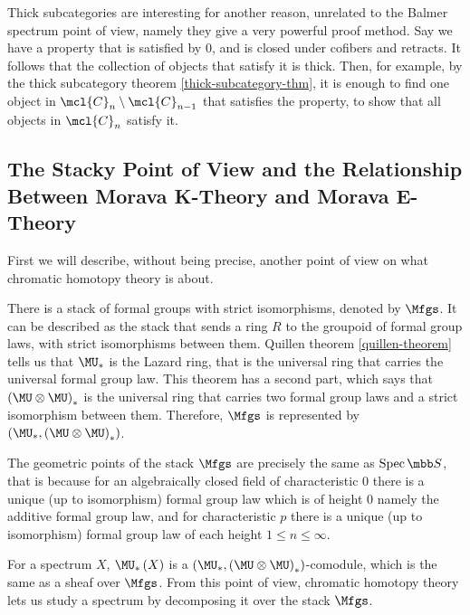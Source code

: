\begin{remark}
	Thick subcategories are interesting for another reason, unrelated to the Balmer spectrum point of view, namely they give a very powerful proof method.
	Say we have a property that is satisfied by $0$, and is closed under cofibers and retracts.
	It follows that the collection of objects that satisfy it is thick.
	Then, for example, by the thick subcategory theorem \ref{thick-subcategory-thm}, it is enough to find one object in $\mcl{C}_n \setminus \mcl{C}_{n-1}$ that satisfies the property, to show that all objects in $\mcl{C}_n$ satisfy it.
\end{remark}



\subsection{The Stacky Point of View and the Relationship Between Morava K-Theory and Morava E-Theory}

First we will describe, without being precise, another point of view on what chromatic homotopy theory is about.

There is a stack of formal groups with strict isomorphisms, denoted by $\Mfgs$.
It can be described as the stack that sends a ring $R$ to the groupoid of formal group laws, with strict isomorphisms between them.
Quillen theorem \ref{quillen-theorem} tells us that $\MU_*$ is the Lazard ring, that is the universal ring that carries the universal formal group law.
This theorem has a second part, which says that $\left(\MU \otimes \MU\right)_*$ is the universal ring that carries two formal group laws and a strict isomorphism between them.
Therefore, $\Mfgs$ is represented by $\left(\MU_*, \left(\MU \otimes \MU\right)_*\right)$.

The geometric points of the stack $\Mfgs$ are precisely the same as $\spec \SS$, that is because for an algebraically closed field of characteristic $0$ there is a unique (up to isomorphism) formal group law which is of height $0$ namely the additive formal group law, and for characteristic $p$ there is a unique (up to isomorphism) formal group law of each height $1 \leq n \leq \infty$.

For a spectrum $X$, $\MU_*\left(X\right)$ is a $\left(\MU_*, \left(\MU \otimes \MU\right)_*\right)$-comodule, which is the same as a sheaf over $\Mfgs$.
From this point of view, chromatic homotopy theory lets us study a spectrum by decomposing it over the stack $\Mfgs$.

